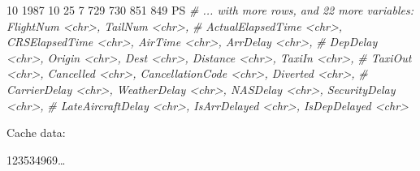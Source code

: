 \documentclass[]{book}
\newenvironment{Shaded}{\begin{snugshade}}{\end{snugshade}}
\newcommand{\KeywordTok}[1]{\textcolor[rgb]{0.13,0.29,0.53}{\textbf{#1}}}
\newcommand{\DataTypeTok}[1]{\textcolor[rgb]{0.13,0.29,0.53}{#1}}
\newcommand{\DecValTok}[1]{\textcolor[rgb]{0.00,0.00,0.81}{#1}}
\newcommand{\StringTok}[1]{\textcolor[rgb]{0.31,0.60,0.02}{#1}}
\newcommand{\CommentTok}[1]{\textcolor[rgb]{0.56,0.35,0.01}{\textit{#1}}}
\newcommand{\OperatorTok}[1]{\textcolor[rgb]{0.81,0.36,0.00}{\textbf{#1}}}
\newcommand{\NormalTok}[1]{#1}
\theoremstyle{definition}
\theoremstyle{definition}
\theoremstyle{definition}
\theoremstyle{remark}
\begin{document}
\begin{Shaded}
\begin{Highlighting}[]
\DecValTok{10}  \DecValTok{1987}    \DecValTok{10}         \DecValTok{25}         \DecValTok{7}     \DecValTok{729}        \DecValTok{730}     \DecValTok{851}        \DecValTok{849}\NormalTok{            PS}
\CommentTok{# ... with more rows, and 22 more variables: FlightNum <chr>, TailNum <chr>,}
\CommentTok{#   ActualElapsedTime <chr>, CRSElapsedTime <chr>, AirTime <chr>, ArrDelay <chr>,}
\CommentTok{#   DepDelay <chr>, Origin <chr>, Dest <chr>, Distance <chr>, TaxiIn <chr>,}
\CommentTok{#   TaxiOut <chr>, Cancelled <chr>, CancellationCode <chr>, Diverted <chr>,}
\CommentTok{#   CarrierDelay <chr>, WeatherDelay <chr>, NASDelay <chr>, SecurityDelay <chr>,}
\CommentTok{#   LateAircraftDelay <chr>, IsArrDelayed <chr>, IsDepDelayed <chr>}
\end{Highlighting}
\end{Shaded}

\begin{Shaded}
\end{Shaded}

Cache data:

\begin{Shaded}
\end{Shaded}

123534969\ldots{}

\begin{Shaded}
\end{Shaded}
\end{document}
